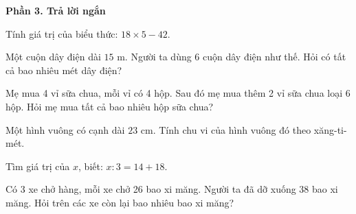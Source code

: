 \textbf{Phần 3. Trả lời ngắn}

\begin{ex} %
Tính giá trị của biểu thức: $18 \times 5 - 42$.
\end{ex}

\begin{ex} %
Một cuộn dây điện dài $15\text{ m}$. Người ta dùng 6 cuộn dây điện như thế. Hỏi có tất cả bao nhiêu mét dây điện?
\end{ex}

\begin{ex} %
Mẹ mua 4 vỉ sữa chua, mỗi vỉ có 4 hộp. Sau đó mẹ mua thêm 2 vỉ sữa chua loại 6 hộp. Hỏi mẹ mua tất cả bao nhiêu hộp sữa chua?
\end{ex}

\begin{ex} %
Một hình vuông có cạnh dài $23\text{ cm}$. Tính chu vi của hình vuông đó theo xăng-ti-mét.
\end{ex}

\begin{ex} %
Tìm giá trị của $x$, biết: $x : 3 = 14 + 18$.
\end{ex}

\begin{ex} %
Có 3 xe chở hàng, mỗi xe chở 26 bao xi măng. Người ta đã dỡ xuống 38 bao xi măng. Hỏi trên các xe còn lại bao nhiêu bao xi măng?
\end{ex}
